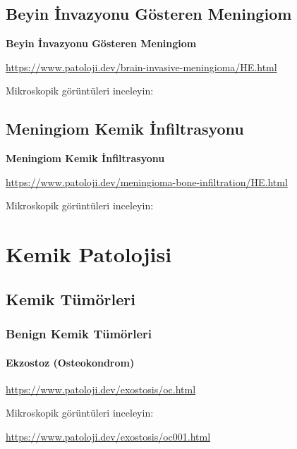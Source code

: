 \documentclass[
  letterpaper,
  DIV=11,
  numbers=noendperiod]{scrreprt}
\begin{document}
\hypertarget{beyin-invazyonu-guxf6steren-meningiom}{%
\chapter{Beyin İnvazyonu Gösteren
Meningiom}\label{beyin-invazyonu-guxf6steren-meningiom}}

\textbf{Beyin İnvazyonu Gösteren Meningiom}

\url{https://www.patoloji.dev/brain-invasive-meningioma/HE.html}

Mikroskopik görüntüleri inceleyin:

\hypertarget{meningiom-kemik-infiltrasyonu}{%
\chapter{Meningiom Kemik
İnfiltrasyonu}\label{meningiom-kemik-infiltrasyonu}}

\textbf{Meningiom Kemik İnfiltrasyonu}

\url{https://www.patoloji.dev/meningioma-bone-infiltration/HE.html}

Mikroskopik görüntüleri inceleyin:

\part{Kemik Patolojisi}

\hypertarget{kemik-tuxfcmuxf6rleri}{%
\chapter{Kemik Tümörleri}\label{kemik-tuxfcmuxf6rleri}}

\hypertarget{benign-kemik-tuxfcmuxf6rleri}{%
\section{Benign Kemik Tümörleri}\label{benign-kemik-tuxfcmuxf6rleri}}

\hypertarget{ekzostoz-osteokondrom}{%
\subsection{Ekzostoz (Osteokondrom)}\label{ekzostoz-osteokondrom}}

\url{https://www.patoloji.dev/exostosis/oc.html}

Mikroskopik görüntüleri inceleyin:

\url{https://www.patoloji.dev/exostosis/oc001.html}
\end{document}
